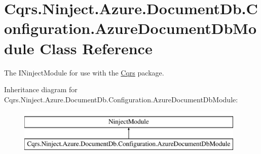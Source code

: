 \hypertarget{classCqrs_1_1Ninject_1_1Azure_1_1DocumentDb_1_1Configuration_1_1AzureDocumentDbModule}{}\section{Cqrs.\+Ninject.\+Azure.\+Document\+Db.\+Configuration.\+Azure\+Document\+Db\+Module Class Reference}
\label{classCqrs_1_1Ninject_1_1Azure_1_1DocumentDb_1_1Configuration_1_1AzureDocumentDbModule}


The I\+Ninject\+Module for use with the \hyperlink{namespaceCqrs}{Cqrs} package.  


Inheritance diagram for Cqrs.\+Ninject.\+Azure.\+Document\+Db.\+Configuration.\+Azure\+Document\+Db\+Module\+:\begin{figure}[H]
\begin{center}
\leavevmode
\includegraphics[height=2.000000cm]{classCqrs_1_1Ninject_1_1Azure_1_1DocumentDb_1_1Configuration_1_1AzureDocumentDbModule}
\end{center}
\end{figure}
